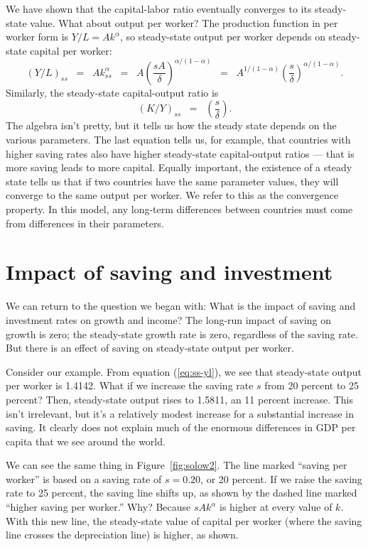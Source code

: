 We have shown that the capital-labor ratio eventually converges to its steady-state value.
What about output per worker?
The production function in per worker form is $ Y/L = A k^\alpha$,
so steady-state output per worker depends on steady-state capital per worker:
\begin{equation}
    (Y/L)_{ss}  \;\;=\;\; A k_{ss}^\alpha
                \;\;=\;\; A \left( \frac{sA}{\delta} \right)^{\alpha/(1-\alpha)}
                \;\;=\;\; A^{1/(1-\alpha)} \left( \frac{s}{\delta}
                \right)^{\alpha/(1-\alpha)} .
                \label{eq:ss-yl}
\end{equation}
Similarly, the steady-state capital-output ratio is
\[
    (K/Y)_{ss} \;\;=\;\; \left( \frac{s}{\delta} \right) .
\]
The algebra isn't pretty, but it tells us how the steady state
depends on the various parameters.
The last equation tells us, for example, that countries with higher saving rates
also have higher steady-state capital-output ratios --- that is more saving leads to more capital.
Equally important, the existence
of a steady state tells us that if two countries have the same
parameter values, they will converge to the same output per
worker. We refer to this as the convergence   property. In this
model, any long-term differences between countries must come from
differences in their parameters.


\section{Impact of saving  and investment}

We can return to the question we began with: What is the impact of saving
and investment rates on growth and income?
The long-run impact of saving 
on growth is zero;
the steady-state growth rate is zero, regardless of the saving rate.
But there is an effect of saving on steady-state output per worker.

Consider our example.
From equation (\ref{eq:ss-yl}), we see that steady-state
output per worker is 1.4142.
What if we increase the saving rate $s$ from 20 percent to 25 percent?
Then, steady-state output rises to 1.5811, an 11 percent increase.
This isn't irrelevant, but it's a relatively modest increase
for a substantial increase in saving.
It clearly does not explain much of the enormous differences
in GDP per capita that we see around the world.

We can see the same thing in Figure~\ref{fig:solow2}. The line marked
``saving per worker'' is based on a saving rate of $s = 0.20$, or
20 percent. If we raise the saving rate to  25 percent,
the saving line shifts up, as
shown by the dashed line marked ``higher saving per worker.'' Why?
Because $s A k^\alpha $ is higher at every value of $k$. With this
new line, the steady-state value of capital per worker (where the
saving line crosses the depreciation line) is higher, as shown.


